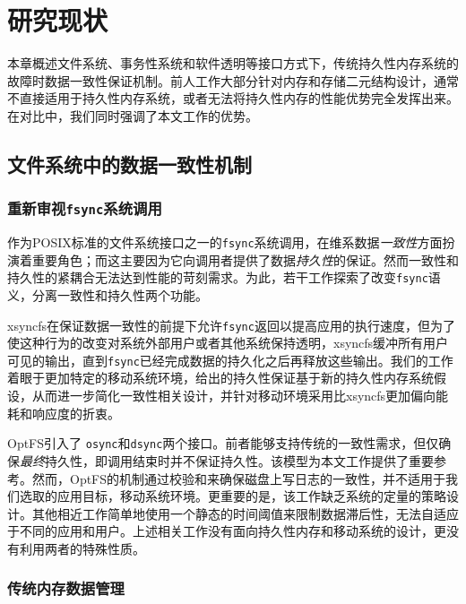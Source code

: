 \chapter{研究现状}
\label{chap:related}

本章概述文件系统、事务性系统和软件透明等接口方式下，传统持久性内存系统的故障时数据一致性保证机制。前人工作大部分针对内存和存储二元结构设计，通常不直接适用于持久性内存系统，或者无法将持久性内存的性能优势完全发挥出来。在对比中，我们同时强调了本文工作的优势。

\section{文件系统中的数据一致性机制}

\subsection{重新审视\texttt{fsync}系统调用}

作为POSIX标准的文件系统接口之一的\texttt{fsync}系统调用，在维系数据\emph{一致性}方面扮演着重要角色；而这主要因为它向调用者提供了数据\emph{持久性}的保证。然而一致性和持久性的紧耦合无法达到性能的苛刻需求。为此，若干工作探索了改变\texttt{fsync}语义，分离一致性和持久性两个功能。

xsyncfs\cite{Nightingale:2006:RS:1298455.1298457}在保证数据一致性的前提下允许\texttt{fsync}返回以提高应用的执行速度，但为了使这种行为的改变对系统外部用户或者其他系统保持透明，xsyncfs缓冲所有用户可见的输出，直到\texttt{fsync}已经完成数据的持久化之后再释放这些输出。我们的工作着眼于更加特定的移动系统环境，给出的持久性保证基于新的持久性内存系统假设，从而进一步简化一致性相关设计，并针对移动环境采用比xsyncfs更加偏向能耗和响应度的折衷。

OptFS\cite{Chidambaram:2013:OCC:2517349.2522726}引入了
\texttt{osync}和\texttt{dsync}两个接口。前者能够支持传统的一致性需求，但仅确保\emph{最终}持久性，即调用结束时并不保证持久性。该模型为本文工作提供了重要参考。然而，OptFS的机制通过校验和来确保磁盘上写日志的一致性，并不适用于我们选取的应用目标，移动系统环境。更重要的是，该工作缺乏系统的定量的策略设计。其他相近工作\cite{Ma:2011:LPF:1989323.1989325,
Mickens:2014:BFC:2616448.2616473, Ports:2010:TCA:1924943.1924963}简单地使用一个静态的时间阈值来限制数据滞后性，无法自适应于不同的应用和用户。上述相关工作没有面向持久性内存和移动系统的设计，更没有利用两者的特殊性质。

\subsection{传统内存数据管理}

